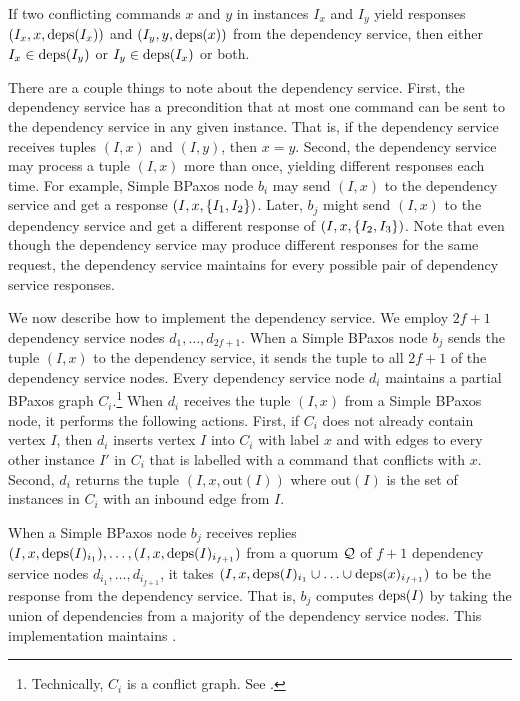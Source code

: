\begin{invariant}
If two conflicting commands $x$ and $y$ in instances $I_x$ and $I_y$ yield
responses $(I_x, x, \text{deps}(I_x))$ and $(I_y, y, \text{deps}(x))$ from the dependency
service, then either $I_x \in \text{deps}(I_y)$ or $I_y \in \text{deps}(I_x)$ or both.
\end{invariant}

There are a couple things to note about the dependency service.
%
First, the dependency service has a precondition that at most one command can
be sent to the dependency service in any given instance. That is, if the
dependency service receives tuples $(I, x)$ and $(I, y)$, then $x = y$.
%
Second, the dependency service may process a tuple $(I, x)$ more than once,
yielding different responses each time. For example, Simple BPaxos node $b_i$
may send $(I, x)$ to the dependency service and get a response $(I, x,
\{I_1, I_2\})$. Later, $b_j$ might send $(I, x)$ to the dependency service
and get a different response of $(I, x, \{I_2, I_3\})$. Note that even though
the dependency service may produce different responses for the same request,
the dependency service maintains  for every possible
pair of dependency service responses.

\newcommand{\out}[1]{\text{out}(#1)}
We now describe how to implement the dependency service. We employ $2f + 1$
dependency service nodes $d_{1}, \ldots, d_{2f + 1}$. When a Simple BPaxos node
$b_j$ sends the tuple $(I, x)$ to the dependency service, it sends the tuple to
all $2f + 1$ of the dependency service nodes. Every dependency service node
$d_i$ maintains a partial BPaxos graph $C_i$.\footnote{Technically, $C_i$ is a
conflict graph. See .} When $d_i$ receives the
tuple $(I, x)$ from a Simple BPaxos node, it performs the following actions.
%
First, if $C_i$ does not already contain vertex $I$, then $d_i$ inserts vertex
$I$ into $C_i$ with label $x$ and with edges to every other instance $I'$ in
$C_i$ that is labelled with a command that conflicts with $x$.
%
Second, $d_i$ returns the tuple $(I, x, \out{I})$ where $\out{I}$ is the set of
instances in $C_i$ with an inbound edge from $I$.

When a Simple BPaxos node $b_j$ receives replies $(I, x, \text{deps}(I)_{i_1}),
\ldots, (I, x, \text{deps}(I)_{i_{f+1}})$ from a quorum $\mathcal{Q}$ of $f + 1$
dependency service nodes $d_{i_1}, \ldots, d_{i_{f+1}}$, it takes $(I, x,
\text{deps}(I)_{i_1} \cup \ldots \cup \text{deps}(x)_{i_{f+1}})$ to be the response from
the dependency service. That is, $b_j$ computes $\text{deps}(I)$ by taking the union
of dependencies from a majority of the dependency service nodes.
%
This implementation maintains .

